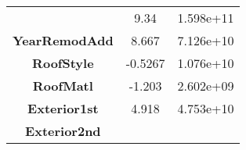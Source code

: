\documentclass[]{article}
\begin{document}
\begin{longtable}[c]{@{}ccc@{}}
\begin{minipage}[t]{0.25\columnwidth}
\strut\end{minipage} &
\begin{minipage}[t]{0.16\columnwidth}\centering\strut
9.34
\strut\end{minipage} &
\begin{minipage}[t]{0.19\columnwidth}\centering\strut
1.598e+11
\strut\end{minipage}\tabularnewline
\begin{minipage}[t]{0.25\columnwidth}\centering\strut
\textbf{YearRemodAdd}
\strut\end{minipage} &
\begin{minipage}[t]{0.16\columnwidth}\centering\strut
8.667
\strut\end{minipage} &
\begin{minipage}[t]{0.19\columnwidth}\centering\strut
7.126e+10
\strut\end{minipage}\tabularnewline
\begin{minipage}[t]{0.25\columnwidth}\centering\strut
\textbf{RoofStyle}
\strut\end{minipage} &
\begin{minipage}[t]{0.16\columnwidth}\centering\strut
-0.5267
\strut\end{minipage} &
\begin{minipage}[t]{0.19\columnwidth}\centering\strut
1.076e+10
\strut\end{minipage}\tabularnewline
\begin{minipage}[t]{0.25\columnwidth}\centering\strut
\textbf{RoofMatl}
\strut\end{minipage} &
\begin{minipage}[t]{0.16\columnwidth}\centering\strut
-1.203
\strut\end{minipage} &
\begin{minipage}[t]{0.19\columnwidth}\centering\strut
2.602e+09
\strut\end{minipage}\tabularnewline
\begin{minipage}[t]{0.25\columnwidth}\centering\strut
\textbf{Exterior1st}
\strut\end{minipage} &
\begin{minipage}[t]{0.16\columnwidth}\centering\strut
4.918
\strut\end{minipage} &
\begin{minipage}[t]{0.19\columnwidth}\centering\strut
4.753e+10
\strut\end{minipage}\tabularnewline
\begin{minipage}[t]{0.25\columnwidth}\centering\strut
\textbf{Exterior2nd}

\end{minipage}
\end{longtable}
\end{document}
